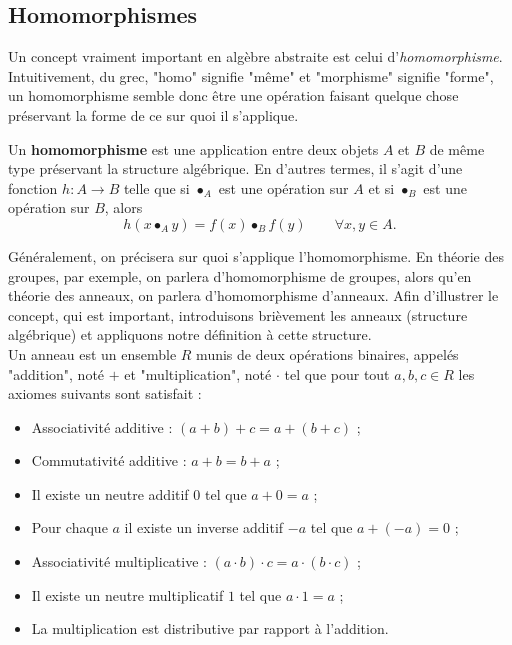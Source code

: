 \documentclass{article}
\begin{document}
\subsection{Homomorphismes}
Un concept vraiment important en algèbre abstraite est celui d'\textit{homomorphisme}. Intuitivement, du grec, "homo" signifie "même" et "morphisme" signifie "forme", un homomorphisme semble donc être une opération faisant quelque chose préservant la forme de ce sur quoi il s'applique.

\begin{definition}[Homomorphisme]{}
    Un \textbf{homomorphisme} est une application entre deux objets $A$ et $B$ de même type préservant la structure algébrique. En d'autres termes, il s'agit d'une fonction $h:A\to B$ telle que si $\bullet_A$ est une opération sur $A$ et si $\bullet_B$ est une opération sur $B$, alors
    $$
    h(x\bullet_A y)=f(x)\bullet_B f(y)\qquad\forall x, y\in A.
    $$
\end{definition}

Généralement, on précisera sur quoi s'applique l'homomorphisme. En théorie des groupes, par exemple, on parlera d'homomorphisme de groupes, alors qu'en théorie des anneaux, on parlera d'homomorphisme d'anneaux. Afin d'illustrer le concept, qui est important, introduisons brièvement les anneaux (structure algébrique) et appliquons notre définition à cette structure.\\

Un anneau est un ensemble $R$ munis de deux opérations binaires, appelés "addition", noté $+$ et "multiplication", noté $\cdot$ tel que pour tout $a, b, c \in R$ les axiomes suivants sont satisfait :

\begin{itemize}[label=\textbullet]
    \item Associativité additive : $(a+b)+c=a+(b+c)$ ;
    \item Commutativité additive : $a+b=b+a$ ;
    \item Il existe un neutre additif $0$ tel que $a+0=a$ ;
    \item Pour chaque $a$ il existe un inverse additif $-a$ tel que $a+(-a)=0$ ;
    \item Associativité multiplicative : $(a\cdot b)\cdot c=a\cdot(b\cdot c)$ ;
    \item Il existe un neutre multiplicatif $1$ tel que $a\cdot 1=a$ ;
    \item La multiplication est distributive par rapport à l'addition.
\end{itemize}
\end{document}

